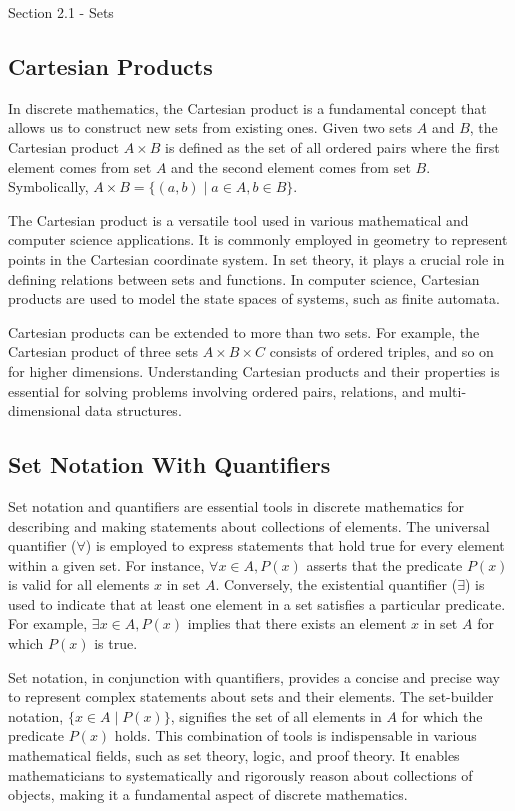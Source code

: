 \begin{notes}{Section 2.1 - Sets}
    \subsection*{Cartesian Products}

    In discrete mathematics, the Cartesian product is a fundamental concept that allows us to construct new sets from existing ones. Given two sets $A$ and $B$, the Cartesian product $A \times B$ is defined 
    as the set of all ordered pairs where the first element comes from set $A$ and the second element comes from set $B$. Symbolically, $A \times B = \{(a, b) \mid a \in A, b \in B\}$.

    The Cartesian product is a versatile tool used in various mathematical and computer science applications. It is commonly employed in geometry to represent points in the Cartesian coordinate system. 
    In set theory, it plays a crucial role in defining relations between sets and functions. In computer science, Cartesian products are used to model the state spaces of systems, such as finite automata.
    
    Cartesian products can be extended to more than two sets. For example, the Cartesian product of three sets $A \times B \times C$ consists of ordered triples, and so on for higher dimensions. Understanding 
    Cartesian products and their properties is essential for solving problems involving ordered pairs, relations, and multi-dimensional data structures.
    
    \subsection*{Set Notation With Quantifiers}

    Set notation and quantifiers are essential tools in discrete mathematics for describing and making statements about collections of elements. The universal quantifier ($\forall$) is employed to express 
    statements that hold true for every element within a given set. For instance, $\forall x \in A, P(x)$ asserts that the predicate $P(x)$ is valid for all elements $x$ in set $A$. Conversely, the existential 
    quantifier ($\exists$) is used to indicate that at least one element in a set satisfies a particular predicate. For example, $\exists x \in A, P(x)$ implies that there exists an element $x$ in set $A$ 
    for which $P(x)$ is true.

    Set notation, in conjunction with quantifiers, provides a concise and precise way to represent complex statements about sets and their elements. The set-builder notation, $\{x \in A \mid P(x)\}$, signifies 
    the set of all elements in $A$ for which the predicate $P(x)$ holds. This combination of tools is indispensable in various mathematical fields, such as set theory, logic, and proof theory. It enables 
    mathematicians to systematically and rigorously reason about collections of objects, making it a fundamental aspect of discrete mathematics.
\end{notes}

